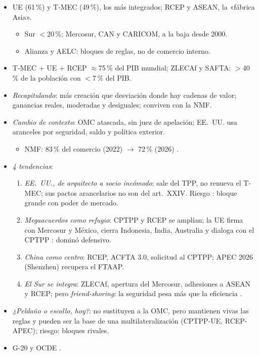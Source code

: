 \documentclass{article}
\begin{document}
\begin{columnas}
\begin{itemize}
\item UE (61\,\%) y T-MEC (49\,\%), los más integrados; RCEP y ASEAN, la «fábrica Asia».
  \begin{itemize}
  \item Sur $<$20\,\%; Mercosur, CAN y CARICOM, a la baja desde 2000.
  \item Alianza y AELC: bloques de reglas, no de comercio interno.
  \end{itemize}
\item T-MEC + UE + RCEP $\approx$75\,\% del PIB mundial; ZLECAf y SAFTA: $>$40\,\% de la población con $<$7\,\% del PIB.
\item \emph{Recapitulando}: más creación que desviación donde hay cadenas de valor; ganancias reales, moderadas y desiguales; conviven con la NMF.
\end{itemize}

\begin{itemize}
\item \emph{Cambio de contexto}: OMC atascada, sin juez de apelación; EE.~UU. usa aranceles por seguridad, saldo y política exterior.
  \begin{itemize}
  \item NMF: 83\,\% del comercio (2022) $\to$ 72\,\% (2026)  .
  \end{itemize}
\item \emph{4 tendencias}:
  \begin{enumerate}
  \item \emph{EE.~UU., de arquitecto a socio incómodo}: sale del TPP, no renueva el T-MEC; sus pactos arancelarios no son del art.~XXIV. Riesgo : bloque grande con poder de mercado.
  \item \emph{Megaacuerdos como refugio}: CPTPP y RCEP se amplían; la UE firma con Mercosur y México, cierra Indonesia, India, Australia y dialoga con el CPTPP : dominó defensivo.
  \item \emph{China como centro}: RCEP, ACFTA 3.0, solicitud al CPTPP; APEC 2026 (Shenzhen) recupera el FTAAP.
  \item \emph{El Sur se integra}: ZLECAf, apertura del Mercosur, adhesiones a ASEAN y RCEP; pero \emph{friend-shoring}: la seguridad pesa más que la eficiencia  .
  \end{enumerate}
\item \emph{¿Peldaño o escollo, hoy?}: no sustituyen a la OMC, pero mantienen vivas las reglas y pueden ser la base de una multilateralización (CPTPP-UE, RCEP-APEC); riesgo: bloques rivales.
\item G-20 y OCDE .
\end{itemize}


\end{columnas}
\end{document}
